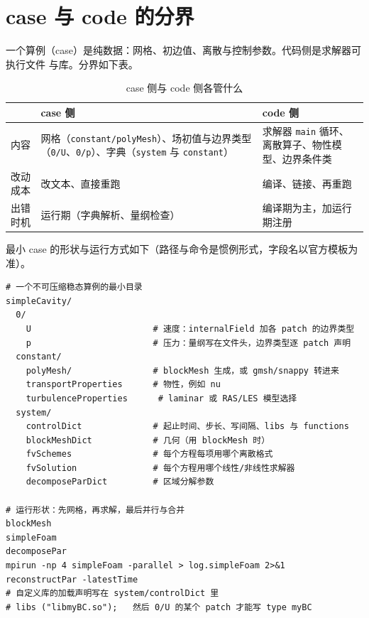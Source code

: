 \documentclass[12pt,a4paper,fontset=fandol]{ctexbook}
\newcommand{\Tp}[1]{\texttt{#1}}
\begin{document}
\section{case 与 code 的分界}
\label{sec:ch06-case-vs-code}

一个算例（case）是纯数据：网格、初边值、离散与控制参数。代码侧是求解器可执行文件
与库。分界如下表。

\begin{table}[htbp]
\centering
\caption{case 侧与 code 侧各管什么}
\label{tab:ch06-case-code}
\begin{tabular}{>{\raggedright\arraybackslash}p{}>{\raggedright\arraybackslash}p{}>{\raggedright\arraybackslash}p{}}
\toprule
& case 侧 & code 侧 \\
\midrule
内容 & 网格（\Tp{constant/polyMesh}）、场初值与边界类型（\Tp{0/U}、\Tp{0/p}）、字典（\Tp{system} 与 \Tp{constant}） & 求解器 \Tp{main} 循环、离散算子、物性模型、边界条件类 \\
改动成本 & 改文本、直接重跑 & 编译、链接、再重跑 \\
出错时机 & 运行期（字典解析、量纲检查） & 编译期为主，加运行期注册 \\
\bottomrule
\end{tabular}
\end{table}

最小 case 的形状与运行方式如下（路径与命令是惯例形式，字段名以官方模板为准）。

\begin{lstlisting}[style=shellstyle, caption={最小 case 的目录形状与运行命令形状},
label={lst:ch06-case-tree}]
# 一个不可压缩稳态算例的最小目录
simpleCavity/
  0/
    U                        # 速度：internalField 加各 patch 的边界类型
    p                        # 压力：量纲写在文件头，边界类型逐 patch 声明
  constant/
    polyMesh/                # blockMesh 生成，或 gmsh/snappy 转进来
    transportProperties      # 物性，例如 nu
    turbulenceProperties      # laminar 或 RAS/LES 模型选择
  system/
    controlDict              # 起止时间、步长、写间隔、libs 与 functions
    blockMeshDict            # 几何（用 blockMesh 时）
    fvSchemes                # 每个方程每项用哪个离散格式
    fvSolution               # 每个方程用哪个线性/非线性求解器
    decomposeParDict         # 区域分解参数

# 运行形状：先网格，再求解，最后并行与合并
blockMesh
simpleFoam
decomposePar
mpirun -np 4 simpleFoam -parallel > log.simpleFoam 2>&1
reconstructPar -latestTime
# 自定义库的加载声明写在 system/controlDict 里
# libs ("libmyBC.so");   然后 0/U 的某个 patch 才能写 type myBC
\end{lstlisting}
\end{document}
